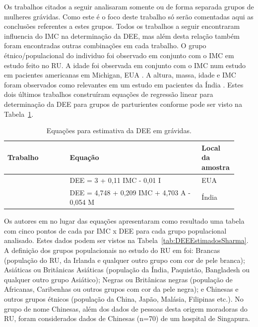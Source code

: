 Os trabalhos citados a seguir analisaram somente ou de forma separada grupos de mulheres grávidas. Como este é o foco deste trabalho só serão comentadas aqui as conclusões referentes a estes grupos. Todos os trabalhos a seguir encontraram influencia do \acrshort{IMC} na determinação da \acrshort{DEE}, mas além desta relação também foram encontradas outras combinações em cada trabalho. O grupo étnico/populacional do individuo foi observado em conjunto com o \acrshort{IMC} em \textcite{Sharma2011} estudo feito no \acrfull{RU}. A idade foi observada em conjunto com o \acrshort{IMC} num estudo em pacientes americanas em Michigan, EUA \cite{Clinkscales2007}. A altura, massa, idade e \acrshort{IMC} foram observados como relevantes em um estudo em pacientes da Índia \cite{Hazarika2016}. Estes dois últimos trabalhos construíram equações de regressão linear para determinação da \acrshort{DEE} para grupos de parturientes conforme pode ser visto na Tabela~\ref{tab:equacoesEstimativaDEE}.

\begin{table}[!ht]
\begin{center}
\caption{Equações para estimativa da DEE em grávidas.}
\label{tab:equacoesEstimativaDEE}
\begin{tabular}{|p{0.26\linewidth}|p{0.55\linewidth}|p{0.105\linewidth}|}
\hline
\textbf{Trabalho} & \textbf{Equação} & \textbf{Local da amostra}\\
\hline\hline
\cite{Clinkscales2007} & DEE = 3 + 0,11 IMC - 0,01 I & EUA \\
\cite{Hazarika2016} & DEE = 4,748 + 0,209 IMC + 4,703 A - 0,054 M & Índia \\
\hline
\end{tabular}
\end{center}
\end{table}

Os autores em \cite{Sharma2011} no lugar das equações apresentaram como resultado uma tabela com cinco pontos de cada par \acrshort{IMC} x \acrshort{DEE} para cada grupo populacional analisado. Estes dados podem ser vistos na Tabela~\ref{tab:DEEEstimadosSharma}. A definição dos grupos populacionais no estudo do \acrshort{RU} em \cite{Sharma2011} foi: Brancas (população do \acrlong{RU}, da Irlanda e qualquer outro grupo com cor de pele branca); Asiáticas ou Britânicas Asiáticas (população da Índia, Paquistão, Bangladesh ou qualquer outro grupo Asiático); Negras ou Britânicas negras (população de Africanas, Caribenhas ou outros grupos com cor da pele negra); e Chinesas e outros grupos étnicos (população da China, Japão, Malásia, Filipinas etc.). No grupo de nome Chinesas, além dos dados de pessoas desta origem moradoras do \acrshort{RU}, foram considerados dados de Chinesas (n=70) de um hospital de Singapura.


